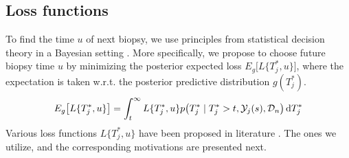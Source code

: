 
\subsection{Loss functions}
\label{subsec : loss_functions}
To find the time $u$ of next biopsy, we use principles from statistical decision theory in a Bayesian setting \citep{bergerDecisionTheory,robertBayesianChoice}. More specifically, we propose to choose future biopsy time $u$ by minimizing the posterior expected loss $E_g\big[L\{T^*_j, u\}\big]$, where the expectation is taken w.r.t. the posterior predictive distribution $g(T^*_j)$. 
\begin{equation*}
E_g\big[L\{T^*_j, u\}\big] = \int_t^\infty L\{T^*_j, u\} p\big(T^*_j \mid T^*_j > t, \mathcal{Y}_j(s), \mathcal{D}_n\big) \mathop{}\!\mathrm{d} T^*_j
\end{equation*}
Various loss functions $L\{T^*_j, u\}$ have been proposed in literature \citep{robertBayesianChoice}. The ones we utilize, and the corresponding motivations are presented next.

